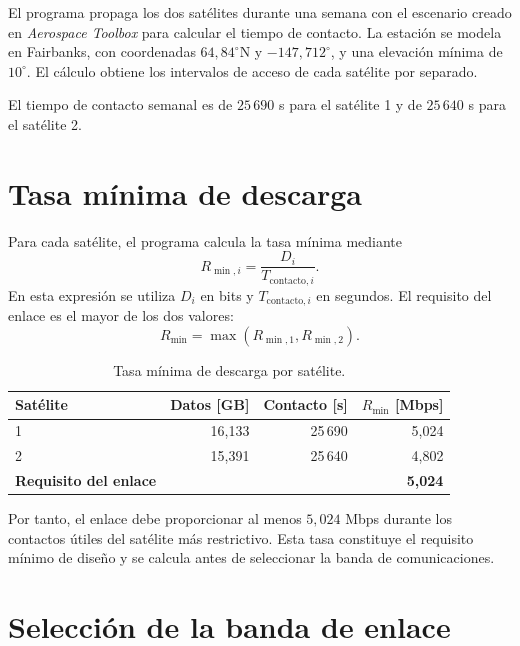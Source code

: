 El programa propaga los dos satélites durante una semana con el escenario creado en \textit{Aerospace Toolbox} para calcular el tiempo de contacto. La estación se modela en Fairbanks, con coordenadas \(64,84^\circ\mathrm{N}\) y \(-147,712^\circ\), y una elevación mínima de \(10^\circ\). El cálculo obtiene los intervalos de acceso de cada satélite por separado.

El tiempo de contacto semanal es de \(25\,690\) s para el satélite 1 y de \(25\,640\) s para el satélite 2.

\section{Tasa mínima de descarga}
\label{sec:downlink}

Para cada satélite, el programa calcula la tasa mínima mediante
\begin{equation}
R_{\min,i}=\frac{D_i}{T_{\mathrm{contacto},i}}.
\label{eq:minimum_downlink_rate}
\end{equation}
En esta expresión se utiliza \(D_i\) en bits y \(T_{\mathrm{contacto},i}\) en segundos. El requisito del enlace es el mayor de los dos valores:
\begin{equation}
R_{\min}=\max\left(R_{\min,1},R_{\min,2}\right).
\label{eq:mission_minimum_downlink_rate}
\end{equation}

\begin{table}[H]
\centering
\caption{Tasa mínima de descarga por satélite.}
\label{tab:minimum_downlink_rate}
\begin{tabular}{@{}lrrr@{}}
\toprule
Satélite & Datos [GB] & Contacto [s] & \(R_{\min}\) [Mbps] \\
\midrule
1 & 16,133 & 25\,690 & 5,024 \\
2 & 15,391 & 25\,640 & 4,802 \\
\midrule
\textbf{Requisito del enlace} & & & \textbf{5,024} \\
\bottomrule
\end{tabular}
\end{table}

Por tanto, el enlace debe proporcionar al menos \(5,024\) Mbps durante los contactos útiles del satélite más restrictivo. Esta tasa constituye el requisito mínimo de diseño y se calcula antes de seleccionar la banda de comunicaciones.

\section{Selección de la banda de enlace}

